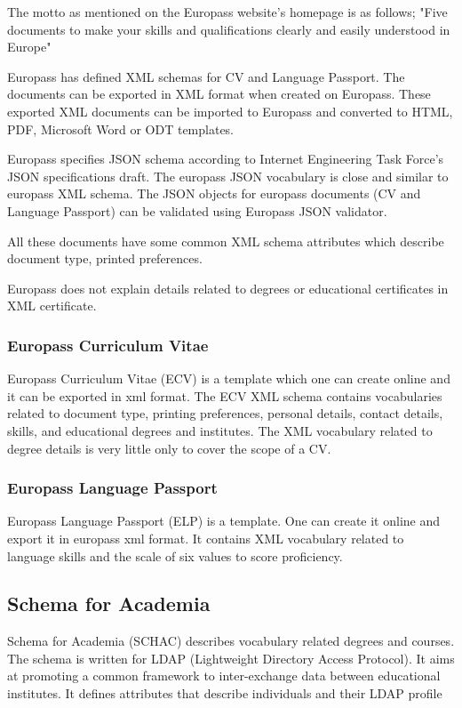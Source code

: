 \documentclass[12pt,a4paper,oneside]{book} %
\begin{document}
    The motto as mentioned on the Europass website's homepage is as follows;
    "Five documents to make your skills and qualifications clearly and easily understood in Europe"

    Europass has defined XML schemas for CV and Language Passport. The documents can be exported in XML format when created on Europass. These exported XML documents can be imported to Europass and converted to HTML, PDF, Microsoft Word or ODT templates.

    Europass specifies JSON schema according to Internet Engineering Task Force's JSON specifications draft. The europass JSON vocabulary is close and similar to europass XML schema. The JSON objects for europass documents (CV and Language Passport) can be validated using Europass JSON validator.

    All these documents have some common XML schema attributes which describe document type, printed preferences.

    Europass does not explain details related to degrees or educational certificates in XML certificate.

        \subsubsection{Europass Curriculum Vitae}
        Europass Curriculum Vitae (ECV) is a template which one can create online and it can be exported in xml format. The ECV XML schema contains vocabularies related to document type, printing preferences, personal details, contact details, skills, and educational degrees and institutes. The XML vocabulary related to degree details is very little only to cover the scope of a CV.

        \subsubsection{Europass Language Passport}
        Europass Language Passport (ELP) is a template. One can create it online and export it in europass xml format. It contains XML vocabulary related to language skills and the scale of six values to score proficiency.

    \subsection{Schema for Academia}
    Schema for Academia (SCHAC) describes vocabulary related degrees and courses. The schema is written for LDAP (Lightweight Directory Access Protocol). It aims at promoting a common framework to inter-exchange data between educational institutes. It defines attributes that describe individuals and their LDAP profile
\end{document}
